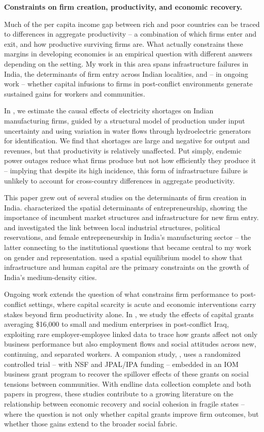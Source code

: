 \documentclass[10pt, letter]{article}
\begin{document}
\noindent \textbf{Constraints on firm creation, productivity, and economic recovery.}

Much of the per capita income gap between rich and poor countries can be traced to differences in aggregate productivity -- a combination of which firms enter and exit, and how productive surviving firms are. What actually constrains these margins in developing economies is an empirical question with different answers depending on the setting. My work in this area spans infrastructure failures in India, the determinants of firm entry across Indian localities, and -- in ongoing work -- whether capital infusions to firms in post-conflict environments generate sustained gains for workers and communities.

In , we estimate the causal effects of electricity shortages on Indian manufacturing firms, guided by a structural model of production under input uncertainty and using variation in water flows through hydroelectric generators for identification. We find that shortages are large and negative for output and revenues, but that productivity is relatively unaffected. Put simply, endemic power outages reduce what firms produce but not how efficiently they produce it -- implying that despite its high incidence, this form of infrastructure failure is unlikely to account for cross-country differences in aggregate productivity.

This paper grew out of several studies on the determinants of firm creation in India.  characterized the spatial determinants of entrepreneurship, showing the importance of incumbent market structures and infrastructure for new firm entry.  and  investigated the link between local industrial structures, political reservations, and female entrepreneurship in India’s manufacturing sector -- the latter connecting to the institutional questions that became central to my work on gender and representation.  used a spatial equilibrium model to show that infrastructure and human capital are the primary constraints on the growth of India’s medium-density cities.

Ongoing work extends the question of what constrains firm performance to post-conflict settings, where capital scarcity is acute and economic interventions carry stakes beyond firm productivity alone. In , we study the effects of capital grants averaging \$16,000 to small and medium enterprises in post-conflict Iraq, exploiting rare employer-employee linked data to trace how grants affect not only business performance but also employment flows and social attitudes across new, continuing, and separated workers. A companion study, , uses a randomized controlled trial -- with NSF and JPAL/IPA funding -- embedded in an IOM business grant program to recover the spillover effects of these grants on social tensions between communities. With endline data collection complete and both papers in progress, these studies contribute to a growing literature on the relationship between economic recovery and social cohesion in fragile states -- where the question is not only whether capital grants improve firm outcomes, but whether those gains extend to the broader social fabric.
\end{document}
